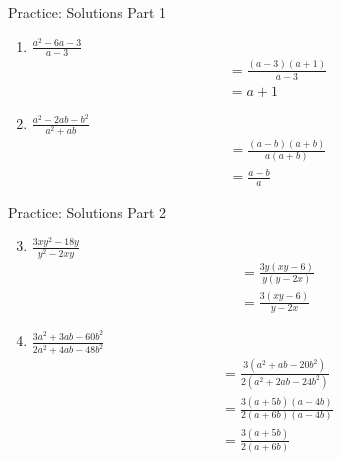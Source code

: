 \documentclass[aspectratio=169]{beamer}
\begin{document}
\begin{frame}{Practice: Solutions Part 1}
\begin{tcolorbox}[colback=lightgray,colframe=accent,title=Detailed Solutions]
\footnotesize
\begin{enumerate}
  \item $\frac{a^2 - 6a - 3}{a - 3}$
  \begin{align*}
    &= \frac{(a-3)(a+1)}{a-3} \\
    &= a+1
  \end{align*}
  \item $\frac{a^2 - 2ab - b^2}{a^2 + ab}$
  \begin{align*}
    &= \frac{(a-b)(a+b)}{a(a+b)} \\
    &= \frac{a-b}{a}
  \end{align*}
\end{enumerate}
\end{tcolorbox}
\end{frame}

\begin{frame}{Practice: Solutions Part 2}
\begin{tcolorbox}[colback=lightgray,colframe=accent,title=Detailed Solutions]
\footnotesize
\begin{enumerate}
  \setcounter{enumi}{2}
  \item $\frac{3xy^2 - 18y}{y^2 - 2xy}$
  \begin{align*}
    &= \frac{3y(xy-6)}{y(y-2x)} \\
    &= \frac{3(xy-6)}{y-2x}
  \end{align*}
  \item $\frac{3a^2 + 3ab - 60b^2}{2a^2 + 4ab - 48b^2}$
  \begin{align*}
    &= \frac{3(a^2 + ab - 20b^2)}{2(a^2 + 2ab - 24b^2)} \\
    &= \frac{3(a+5b)(a-4b)}{2(a+6b)(a-4b)} \\
    &= \frac{3(a+5b)}{2(a+6b)}
  \end{align*}
\end{enumerate}
\end{tcolorbox}
\end{frame}
\end{document}
